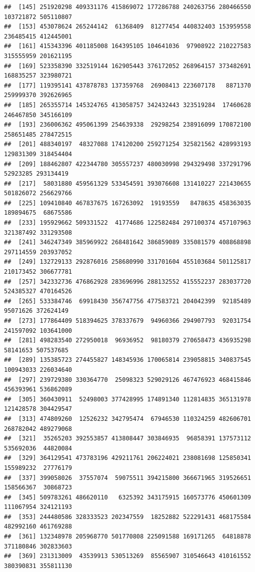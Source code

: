 \documentclass{article}\usepackage[]{graphicx}\usepackage[]{color}
\makeatletter
\newenvironment{kframe}{%
 \def\at@end@of@kframe{}%
 \ifinner\ifhmode%
  \def\at@end@of@kframe{\end{minipage}}%
  \begin{minipage}{\columnwidth}%
 \fi\fi%
 \def\FrameCommand##1{\hskip\@totalleftmargin \hskip-\fboxsep
 \colorbox{shadecolor}{##1}\hskip-\fboxsep
     \hskip-\linewidth \hskip-\@totalleftmargin \hskip\columnwidth}%
 \MakeFramed {\advance\hsize-\width
   \@totalleftmargin\z@ \linewidth\hsize
   \@setminipage}}%
 {\par\unskip\endMakeFramed%
 \at@end@of@kframe}
\newenvironment{knitrout}{}{} %
\makeatother
\begin{document}
\begin{knitrout}
\begin{kframe}
\begin{verbatim}
##  [145] 251920298 409331176 415869072 177286788 240263756 280466550 103721872 505110807
##  [153] 453078624 265244142  61368409  81277454 440832403 153959558 236485415 412445001
##  [161] 415343396 401185008 164395105 104641036  97908922 210227583 315555959 201621195
##  [169] 523358390 332519144 162905443 376172052 268964157 373482691 168835257 323980721
##  [177] 119395141 437878783 137359768  26908413 223607178   8871370 259999370 392626965
##  [185] 265355714 145324765 413058757 342432443 323519284  17460628 246467850 345166109
##  [193] 236006362 495061399 254639338  29298254 238916099 170872100 258651485 278472515
##  [201] 488340197  48327088 174120200 259271254 325821562 428993193 129831309 318454404
##  [209] 188462807 422344780 305557237 480030998 294329498 337291796  52923285 293134419
##  [217]  58031880 459561329 533454591 393076608 131410227 221430655 501826072 256629766
##  [225] 109410840 467837675 167263092  19193559   8478635 458363035 189894675  68675586
##  [233] 195929662 509331522  41774686 122582484 297100374 457107963 321387492 331293508
##  [241] 346247349 385969922 268481642 386859089 335081579 408868898 297114559 203937052
##  [249] 132729133 292876016 258680990 331701604 455103684 501125817 210173452 306677781
##  [257] 342332736 476862928 283696996 288132552 415552237 283037720 524385327 470164526
##  [265] 533384746  69918430 356747756 477583721 204042399  92185489  95071626 372624149
##  [273] 177864409 518394625 378337679  94960366 294907793  92031754 241597092 103641000
##  [281] 498283540 272950018  96936952  98180379 270658473 436935298  58141653 507537685
##  [289] 135385723 274455827 148345936 170065814 239058815 340837545 100943033 226034640
##  [297] 239729380 330364770  25098323 529029126 467476923 468415846 456393961 536862089
##  [305] 360430911  52498003 377428995 174891340 112814835 365131978 121428578 304429547
##  [313] 474809260  12526232 342795474  67946530 110324259 482606701 268782042 489279068
##  [321]  35265203 392553857 413808447 303846935  96858391 137573112 535692036  44820084
##  [329] 364129541 473783196 429211761 206224021 238081698 125850341 155989232  27776179
##  [337] 399058026  37557074  59075511 394215800 366671965 319526651 158566367  30868723
##  [345] 509783261 486620110   6325392 343175915 160573776 450601309 111067954 324121193
##  [353] 244480586 328333523 202347559  18252882 522291431 468175584 482992160 461769288
##  [361] 132348978 205968770 501770808 225091588 169171265  64818878 371180846 302833603
##  [369] 231313009  43539913 530513269  85565907 310546643 410161552 380390831 355811130

\end{verbatim}
\end{kframe}
\end{knitrout}
\end{document}
